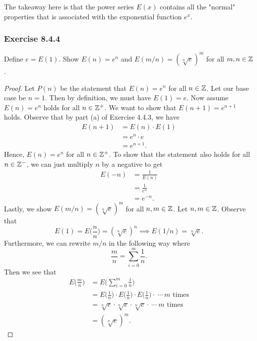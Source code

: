 The takeaway here is that the power series \( E(x)  \) contains all the "normal" properties that is associated with the exponential function \( e^{x} \). 

\subsubsection{Exercise 8.4.4} Define \( e = E(1)  \). Show \( E(n) = e^{n}  \) and \( E(m/n) = (\sqrt[n]{e})^{m} \) for all \( m,n \in \mathbb{Z}  \).
\begin{proof}
Let \( P(n)  \) be the statement that \( E(n) = e^{n} \) for all \(  n \in \mathbb{Z}  \). Let our base case be \( n = 1  \). Then by definition, we must have \( E(1) = e  \). Now assume \( E(n) = e^{n}   \) holds for all \( n \in \mathbb{Z}^{+} \). We want to show that \( E(n+1) = e^{n+1 } \) holds. Observe that by part (a) of Exercise 4.4.3, we have 
\begin{align*}
    E(n+1) &= E(n) \cdot E(1)  \\
           &= e^{n} \cdot e \\
           &= e^{n+1}.
\end{align*}
Hence, \( E(n) = e^{n}  \) for all \( n \in \mathbb{Z}^{+} \). To show that the statement also holds for all \( n \in \mathbb{Z}^{-} \), we can just multiply \( n  \) by a negative to get 
\begin{align*}
    E(-n) &= \frac{ 1 }{ E(n) }  \\
          &= \frac{ 1  }{ e^{n}  } \\
          &= e^{-n}.
\end{align*}
Lastly, we show \( E(m/n) = (\sqrt[n]{e} )^{m } \) for all \( n,m \in \mathbb{Z}  \). Let \( n,m \in \mathbb{Z}  \). Observe that 
\[  E(1)  = E \Big( \frac{ n }{ n }  \Big) = ( \sqrt[n]{e})^{n} \implies E(1/n) = \sqrt[n]{e}.  \] Furthermore, we can rewrite \( m / n  \) in the following way where 
\[  \frac{ m }{ n }  = \sum_{ i=0 }^{ m  } \frac{ 1 }{ n }. \]
Then we see that 
\begin{align*}
    E \Big( \frac{ m }{ n }  \Big) &= E \Big( \sum_{ i=0 }^{ m  } \frac{ 1 }{ n }  \Big) \\
                                   &= E \Big( \frac{ 1 }{ n }  \Big) \cdot E \Big( \frac{ 1 }{ n }  \Big) \cdot E \Big( \frac{ 1 }{ n }  \Big) \cdot \ \dotsb \  m \text{ times} \\ 
                                   &= \sqrt[n]{e} \cdot \sqrt[n ]{e } \cdot \sqrt[n]{e} \cdot \ \dotsb \ m \text{ times} \\
                                   &= (\sqrt[n]{e})^{m}.
\end{align*}
\end{proof}

